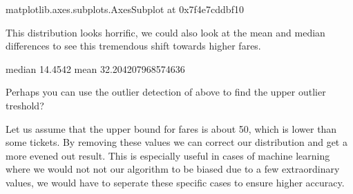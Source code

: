 \documentclass[letterpaper,10pt,english]{jupyterBook}
\begin{document}
\begin{sphinxVerbatim}[commandchars=\\\{\}]
\PYGZlt{}matplotlib.axes.\PYGZus{}subplots.AxesSubplot at 0x7f4e7cddbf10\PYGZgt{}
\end{sphinxVerbatim}

\noindent{}

\sphinxAtStartPar
This distribution looks horrific, we could also look at the mean and median differences to see this tremendous shift towards higher fares.

\begin{sphinxVerbatim}[commandchars=\\\{\}]
\end{sphinxVerbatim}

\begin{sphinxVerbatim}[commandchars=\\\{\}]
median
14.4542
mean
32.204207968574636
\end{sphinxVerbatim}

\sphinxAtStartPar
Perhaps you can use the outlier detection of above to find the upper outlier treshold?

\sphinxAtStartPar
Let us assume that the upper bound for fares is about 50, which is lower than some tickets.
By removing these values we can correct our distribution and get a more evened out result.
This is especially useful in cases of machine learning where we would not not our algorithm to be biased due to a few extraordinary values, we would have to seperate these specific cases to ensure higher accuracy.

\begin{sphinxVerbatim}[commandchars=\\\{\}]
\PYG{p}{[}\PYG{p}{]}
\end{sphinxVerbatim}
\end{document}
